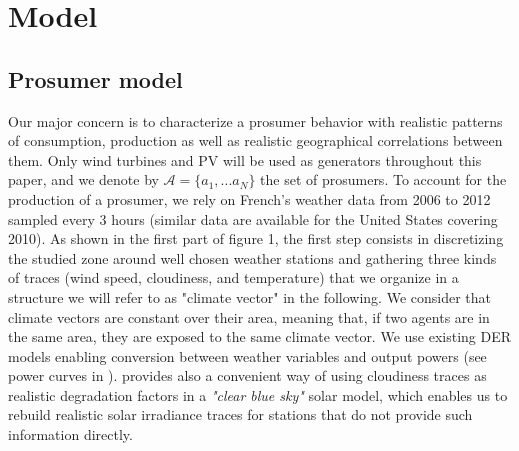 \documentclass[conference]{IEEEtran}
\begin{document}

%
%

\section{Model}
\label{sec:model}
\subsection{Prosumer model}\label{subsec:ProsumerModel}

Our major concern is to characterize a prosumer behavior with realistic patterns of consumption, production as well as realistic geographical correlations between them. Only wind turbines and PV will be used as generators throughout this paper, and we denote by $ \mathcal{A} = \{ a_{1},...a_{N} \} $ the set of prosumers. To account for the production of a prosumer, we rely on French's weather data from 2006 to 2012 sampled every 3 hours \cite{Infoclimat} (similar data are available for the United States covering 2010\cite{NCDC}). As shown in the first part of figure 1, the first step consists in discretizing the studied zone around well chosen weather stations and gathering three kinds of traces (wind speed, cloudiness, and temperature) that we organize in a structure we will refer to as "climate vector" in the following. We consider that climate vectors are constant over their area, meaning that, if two agents are in the same area, they are exposed to the same climate vector. We use existing DER models enabling conversion between weather variables and output powers (see power curves in \cite{Kota2011} \cite{windturbinemodel}). \cite{Dans2007} provides also a convenient way of using cloudiness traces as realistic degradation factors in a \textit{"clear blue sky"} solar model, which enables us to rebuild realistic solar irradiance traces for stations that do not provide such information directly.
\end{document}
